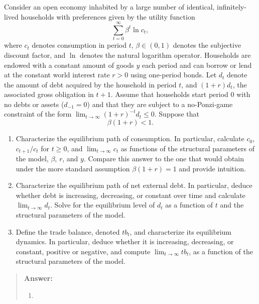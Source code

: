 \begin{exercise}
Consider an open economy inhabited by a 
\label{exercise:endowment_impatient}
large number of identical, infinitely-lived households with preferences given by the utility function
\[
\sum_{t=0}^{\infty}\beta^t \ln c_t,
\]
where $c_t$ denotes consumption in period $t$, $\beta\in(0,1)$ denotes the subjective discount factor, and $\ln$ denotes the natural logarithm operator. Households are endowed with a constant amount of goods $y$ each period and can borrow or lend at the constant world interest rate $r>0$ using one-period bonds. Let $d_t$ denote the amount of debt acquired
by the household in  period $t$, and $(1+r)d_t$, the associated gross obligation in $t+1$.   Assume that households start period 0 with no debts or assets ($d_{-1}=0$) and that they are subject to a no-Ponzi-game constraint of the form 
$\lim_{t\rightarrow \infty}(1+r)^{-t}d_t\le 0$. 
Suppose that 
\[\beta(1+r)<1.\]

\begin{enumerate}
\item Characterize the equilibrium path of consumption. In particular, calculate $c_0$, $c_{t+1}/c_t$ for $t\ge 0$, and $\lim_{t\rightarrow \infty}c_t$ as functions of the structural parameters of the model, $\beta$, $r$, and $y$.  Compare this answer to the one that would obtain under the more standard assumption  $\beta (1+r) = 1$ and provide intuition. 
\item Characterize the equilibrium path of net external debt. In particular,  deduce whether debt is increasing, decreasing, or constant over time and calculate $\lim_{t\rightarrow \infty} d_t$. Solve for the equilibrium level of $d_t$ as a function of $t$ and  the structural parameters of the model. 
\item Define the trade balance, denoted $tb_t$,  and characterize its equilibrium dynamics. In particular, deduce whether it is increasing, decreasing, or constant, positive or negative, and compute $\lim_{t\rightarrow \infty} tb_t$, as a function of the structural parameters of the model. 
\end{enumerate}
\begin{quote}
{\bf Answer:} 

\begin{enumerate}
\item 


\end{enumerate}
\end{quote}
\end{exercise}
